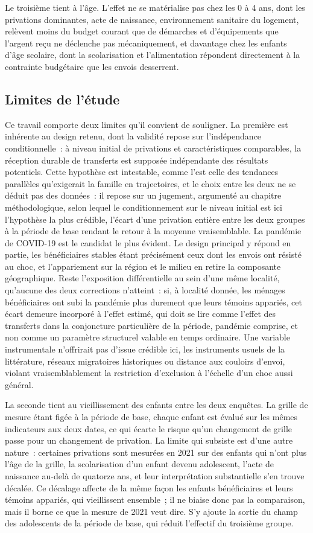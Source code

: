 Le troisième tient à l'âge. L'effet ne se matérialise pas chez les 0 à 4
ans, dont les privations dominantes, acte de naissance, environnement
sanitaire du logement, relèvent moins du budget courant que de démarches
et d'équipements que l'argent reçu ne déclenche pas mécaniquement, et
davantage chez les enfants d'âge scolaire, dont la scolarisation et
l'alimentation répondent directement à la contrainte budgétaire que les
envois desserrent.

\subsection{Limites de l'étude}

Ce travail comporte deux limites qu'il convient de souligner. La première est inhérente au design retenu, dont la validité
repose sur l'indépendance conditionnelle~: à niveau initial de privations
et caractéristiques comparables, la réception durable de transferts est
supposée indépendante des résultats potentiels. Cette hypothèse est
intestable, comme l'est celle des tendances parallèles qu'exigerait la
famille en trajectoires, et le choix entre les deux ne se déduit pas des
données~: il repose sur un jugement, argumenté au chapitre méthodologique,
selon lequel le conditionnement sur le niveau initial est ici l'hypothèse
la plus crédible, l'écart d'une privation entière entre les deux groupes à
la période de base rendant le retour à la moyenne vraisemblable. La pandémie de COVID-19 est le candidat le plus évident.
Le design principal y répond en partie, les bénéficiaires stables étant
précisément ceux dont les envois ont résisté au choc, et l'appariement
sur la région et le milieu en retire la composante géographique. Reste
l'exposition différentielle au sein d'une même localité, qu'aucune des
deux corrections n'atteint~: si, à localité donnée, les ménages
bénéficiaires ont subi la pandémie plus durement que leurs témoins
appariés, cet écart demeure incorporé à l'effet estimé, qui doit se lire
comme l'effet des transferts dans la conjoncture particulière de la
période, pandémie comprise, et non comme un paramètre structurel valable
en temps ordinaire. Une variable instrumentale n'offrirait pas d'issue
crédible ici, les instruments usuels de la littérature, réseaux
migratoires historiques ou distance aux couloirs d'envoi, violant
vraisemblablement la restriction d'exclusion à l'échelle d'un choc
aussi général.

La seconde tient au vieillissement des enfants entre les deux enquêtes.
La grille de mesure étant figée à la période de base, chaque enfant est
évalué sur les mêmes indicateurs aux deux dates, ce qui écarte le risque
qu'un changement de grille passe pour un changement de privation. La
limite qui subsiste est d'une autre nature~: certaines privations sont
mesurées en 2021 sur des enfants qui n'ont plus l'âge de la grille, la
scolarisation d'un enfant devenu adolescent, l'acte de naissance au-delà
de quatorze ans, et leur interprétation substantielle s'en trouve
décalée. Ce décalage affecte de la même façon les enfants bénéficiaires
et leurs témoins appariés, qui vieillissent ensemble~; il ne biaise donc
pas la comparaison, mais il borne ce que la mesure de 2021 veut dire.
S'y ajoute la sortie du champ des adolescents de la période de base,
qui réduit l'effectif du troisième groupe.
